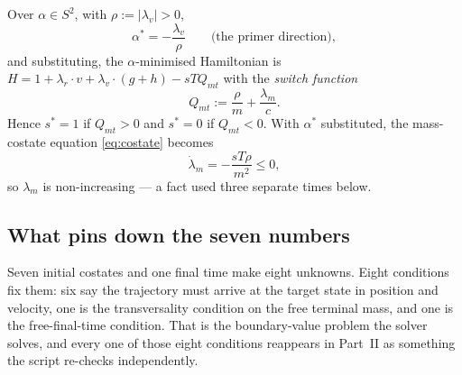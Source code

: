 \documentclass[11pt]{article}
\newcommand{\lv}{\lambda_v}\newcommand{\lr}{\lambda_r}\newcommand{\lm}{\lambda_m}
\newcommand{\Qmt}{Q_{mt}}
\begin{document}
\begin{rig}
Over $\alpha \in S^2$, with $\rho := |\lv| > 0$,
\begin{equation}\label{eq:alpha}
\alpha^* = -\frac{\lv}{\rho} \qquad \text{(the primer direction)},
\end{equation}
and substituting, the $\alpha$-minimised Hamiltonian is
$H = 1 + \lr\cdot v + \lv\cdot(g+h) - sT\Qmt$ with the \emph{switch function}
\begin{equation}\label{eq:Q}
\Qmt := \frac{\rho}{m} + \frac{\lm}{c}.
\end{equation}
Hence $s^* = 1$ if $\Qmt > 0$ and $s^* = 0$ if $\Qmt < 0$. With $\alpha^*$
substituted, the mass-costate equation \eqref{eq:costate} becomes
\begin{equation}\label{eq:lammdot}
\dot\lm = -\frac{sT\rho}{m^2} \le 0,
\end{equation}
so $\lm$ is non-increasing --- a fact used three separate times below.
\end{rig}

\subsection{What pins down the seven numbers}

\begin{intu}
Seven initial costates and one final time make eight unknowns. Eight conditions
fix them: six say the trajectory must arrive at the target state in position
and velocity, one is the transversality condition on the free terminal mass,
and one is the free-final-time condition. That is the boundary-value problem
the solver solves, and every one of those eight conditions reappears in Part~II
as something the script re-checks independently.
\end{intu}
\end{document}
